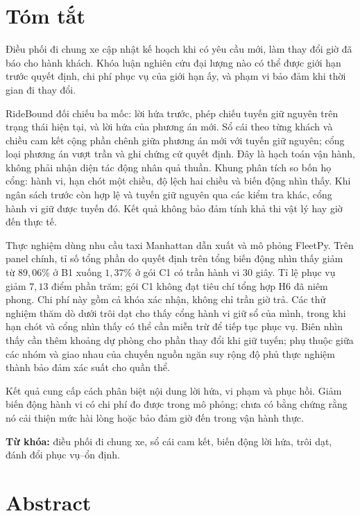 ﻿\chapter*{Tóm tắt}

Điều phối đi chung xe cập nhật kế hoạch khi có yêu cầu mới, làm thay đổi giờ đã báo cho
hành khách. Khóa luận nghiên cứu đại lượng nào có thể được giới hạn trước quyết định,
chi phí phục vụ của giới hạn ấy, và phạm vi bảo đảm khi thời gian đi thay đổi.

RideBound đối chiếu ba mốc: lời hứa trước, phép chiếu tuyến giữ nguyên trên trạng thái
hiện tại, và lời hứa của phương án mới. Sổ cái theo từng khách và chiều cam kết cộng
phần chênh giữa phương án mới với tuyến giữ nguyên; cổng loại phương án vượt trần và
ghi chứng cứ quyết định. Đây là hạch toán vận hành, không phải nhận diện tác động nhân
quả thuần. Khung phân tích so bốn họ cổng: hành vi, hạn chót một chiều, độ lệch hai chiều
và biến động nhìn thấy. Khi ngân sách trước còn hợp lệ và tuyến giữ nguyên qua các kiểm
tra khác, cổng hành vi giữ được tuyến đó. Kết quả không bảo đảm tính khả thi vật lý hay
giờ đến thực tế.

Thực nghiệm dùng nhu cầu taxi Manhattan dẫn xuất và mô phỏng FleetPy. Trên panel chính,
tỉ số tổng phần do quyết định trên tổng biến động nhìn thấy giảm từ $89{,}06\%$ ở B1
xuống $1{,}37\%$ ở gói C1 có trần hành vi 30 giây. Tỉ lệ phục vụ giảm $7{,}13$ điểm
phần trăm; gói C1 không đạt tiêu chí tổng hợp H6 đã niêm phong. Chi phí này gồm cả khóa
xác nhận, không chỉ trần giờ trả. Các thử nghiệm thăm dò dưới trôi dạt cho thấy cổng
hành vi giữ sổ của mình, trong khi hạn chót và cổng nhìn thấy có thể cần miễn trừ để
tiếp tục phục vụ. Biên nhìn thấy cần thêm khoảng dự phòng cho phần thay đổi khi giữ
tuyến; phụ thuộc giữa các nhóm và giao nhau của chuyến nguồn ngăn suy rộng độ phủ
thực nghiệm thành bảo đảm xác suất cho quần thể.

Kết quả cung cấp cách phân biệt nội dung lời hứa, vi phạm và phục hồi. Giảm biến động
hành vi có chi phí đo được trong mô phỏng; chưa có bằng chứng rằng nó cải thiện mức
hài lòng hoặc bảo đảm giờ đến trong vận hành thực.

\vspace{6pt}
\noindent\textbf{Từ khóa:} điều phối đi chung xe, sổ cái cam kết, biến động lời hứa,
trôi dạt, đánh đổi phục vụ--ổn định.

\clearpage

\chapter*{Abstract}

